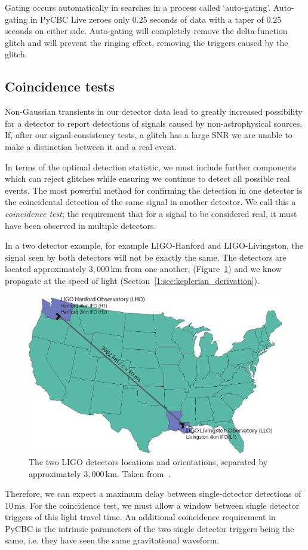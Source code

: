 Gating occurs automatically in \gwadj searches in a process called `auto-gating'. Auto-gating in PyCBC Live zeroes only $0.25$ seconds of data with a taper of $0.25$ seconds on either side. Auto-gating will completely remove the delta-function glitch and will prevent the ringing effect, removing the triggers caused by the glitch.

\subsection{\label{2:sec:coincidence-test}Coincidence tests}

Non-Gaussian transients in our detector data lead to greatly increased possibility for a \gwadj detector to report detections of \gwadj signals caused by non-astrophysical sources. If, after our signal-consistency tests, a glitch has a large SNR we are unable to make a distinction between it and a real event.

In terms of the optimal detection statistic, we must include further components which can reject glitches while ensuring we continue to detect all possible real events. The most powerful method for confirming the detection in one detector is the coincidental detection of the same signal in another detector. We call this a \textit{coincidence test}; the requirement that for a signal to be considered real, it must have been observed in multiple detectors.

In a two detector example, for example LIGO-Hanford and LIGO-Livingston, the signal seen by both detectors will not be exactly the same. The detectors are located approximately $3,000 \, \text{km}$ from one another, (Figure~\ref{2:fig:observatories}) and we know \gws propagate at the speed of light (Section~\ref{1:sec:keplerian_derivation}).
%
\begin{figure}
    \centering
    \includegraphics[width=0.8\linewidth]{images/2_searches/observatories.png}
    \caption{The two LIGO detectors locations and orientations, separated by approximately $3,000 \, \text{km}$. Taken from~\cite{Brown_Thesis:2004}.}
    \label{2:fig:observatories}
\end{figure}
%
Therefore, we can expect a maximum delay between single-detector detections of $10 \, \text{ms}$. For the coincidence test, we must allow a window between single detector triggers of this light travel time. An additional coincidence requirement in PyCBC is the intrinsic parameters of the two single detector triggers being the same, i.e. they have seen the same gravitational waveform.


